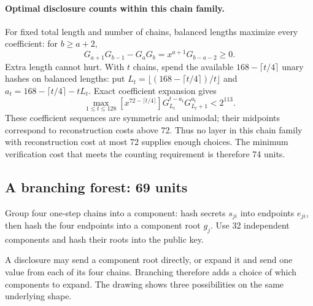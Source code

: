 \documentclass[10pt]{article}
\begin{document}
\paragraph{Optimal disclosure counts within this chain family.} For fixed total length and number of chains, balanced lengths maximize every coefficient: for $b\ge a+2$,
\[
 G_{a+1}G_{b-1}-G_aG_b=x^{a+1}G_{b-a-2}\ge0.
\]
Extra length cannot hurt. With $t$ chains, spend the available $168-\lceil t/4\rceil$ unary hashes on balanced lengths: put $L_t=\lfloor(168-\lceil t/4\rceil)/t\rfloor$ and $a_t=168-\lceil t/4\rceil-tL_t$. Exact coefficient expansion gives
\[
 \max_{1\le t\le128}[x^{72-\lceil t/4\rceil}]G_{L_t}^{t-a_t}G_{L_t+1}^{a_t}<2^{113}.
\]
These coefficient sequences are symmetric and unimodal; their midpoints correspond to reconstruction costs above 72. Thus no layer in this chain family with reconstruction cost at most 72 supplies enough choices. The minimum verification cost that meets the counting requirement is therefore 74 units.

\clearpage
\subsection{A branching forest: 69 units}
Group four one-step chains into a component: hash secrets $s_{ji}$ into endpoints $e_{ji}$, then hash the four endpoints into a component root $g_j$. Use 32 independent components and hash their roots into the public key.

A disclosure may send a component root directly, or expand it and send one value from each of its four chains. Branching therefore adds a choice of which components to expand. The drawing shows three possibilities on the same underlying shape.
\end{document}
